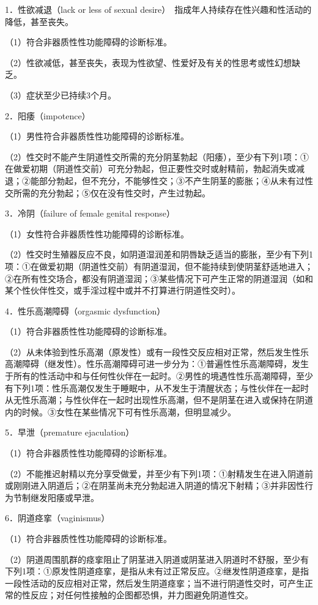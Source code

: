 1．性欲减退（lack or less of sexual
desire）　指成年人持续存在性兴趣和性活动的降低，甚至丧失。

（1）符合非器质性性功能障碍的诊断标准。

（2）性欲减低，甚至丧失，表现为性欲望、性爱好及有关的性思考或性幻想缺乏。

（3）症状至少已持续3个月。

2．阳痿（impotence）

（1）男性符合非器质性性功能障碍的诊断标准。

（2）性交时不能产生阴道性交所需的充分阴茎勃起（阳痿），至少有下列1项：①在做爱初期（阴道性交前）可充分勃起，但正要性交时或射精前，勃起消失或减退；②能部分勃起，但不充分，不能够性交；③不产生阴茎的膨胀；④从未有过性交所需的充分勃起；⑤仅在没有性交时，产生过勃起。

3．冷阴（failure of female genital response）

（1）女性符合非器质性性功能障碍的诊断标准。

（2）性交时生殖器反应不良，如阴道湿润差和阴唇缺乏适当的膨胀，至少有下列1项：①在做爱初期（阴道性交前）有阴道湿润，但不能持续到使阴茎舒适地进入；②在所有性交场合，都没有阴道湿润；③某些情况下可产生正常的阴道湿润（如和某个性伙伴性交，或手淫过程中或并不打算进行阴道性交时）。

4．性乐高潮障碍（orgasmic dysfunction）

（1）符合非器质性性功能障碍的诊断标准。

（2）从未体验到性乐高潮（原发性）或有一段性交反应相对正常，然后发生性乐高潮障碍（继发性）。性乐高潮障碍可进一步分为：①普遍性性乐高潮障碍，发生于所有的性活动中和与任何性伙伴在一起时。②男性的境遇性性乐高潮障碍，至少有下列1项：性乐高潮仅发生于睡眠中，从不发生于清醒状态；与性伙伴在一起时从无性乐高潮；与性伙伴在一起时出现性乐高潮，但不是阴茎在进入或保持在阴道内的时候。③女性在某些情况下可有性乐高潮，但明显减少。

5．早泄（premature ejaculation）

（1）符合非器质性性功能障碍的诊断标准。

（2）不能推迟射精以充分享受做爱，并至少有下列1项：①射精发生在进入阴道前或刚刚进入阴道后；②在阴茎尚未充分勃起进入阴道的情况下射精；③并非因性行为节制继发阳痿或早泄。

6．阴道痉挛（vaginismus）

（1）符合非器质性性功能障碍的诊断标准。

（2）阴道周围肌群的痉挛阻止了阴茎进入阴道或阴茎进入阴道时不舒服，至少有下列1项：①原发性阴道痉挛，是指从未有过正常反应。②继发性阴道痉挛，是指一段性活动的反应相对正常，然后发生阴道痉挛；当不进行阴道性交时，可产生正常的性反应；对任何性接触的企图都恐惧，并力图避免阴道性交。

